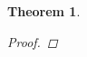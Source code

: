 \documentclass[11pt]{article}
\newtheorem{theorem}{Theorem}
\begin{document}
\begin{theorem}
\begin{proof}

\end{proof}
\end{theorem}
\end{document}
